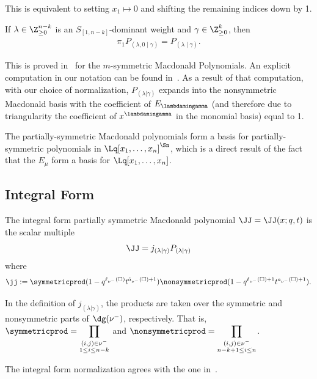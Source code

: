 This is equivalent to setting $x_1 \mapsto 0$ and shifting the remaining indices down by 1.


\begin{prop} If $\lambda \in \Z_{\geq 0}^{n-k}$ is an $S_{[1,n-k]}$-dominant weight and $\gamma \in \Z_{\geq 0}^k$, then
\begin{align}\label{stability}\pi_1 P_{(\lambda,0\mid\gamma)} =  P_{(\lambda\mid\gamma)}.\end{align}\end{prop}

This is proved in~\cite{Lapointe} for the $m$-symmetric Macdonald Polynomials. An explicit computation in our notation can be found in~\cite{Dissertation}. As a result of that computation, with our choice of normalization, $P_{(\lambda|\gamma)}$ expands into the nonsymmetric Macdonald basis with the coefficient of $E_{\lambdamingamma}$ (and therefore due to triangularity the coefficient of $x^{\lambdamingamma}$ in the monomial basis) equal to 1.

\begin{rema}
    The partially-symmetric Macdonald polynomials form a basis for partially-symmetric polynomials in $\Lq[x_1, \dotsc, x_n]^{\Sn}$, which is a direct result of the fact that the $E_\mu$ form a basis for $\Lq[x_1,\dotsc,x_n]$.
\end{rema}


\subsection{Integral Form}\label{integralformsection}
The integral form partially symmetric Macdonald polynomial $\JJ=\JJ(x;q,t)$ is the scalar multiple
\[
\JJ = j_{(\lambda|\gamma)}P_{(\lambda|\gamma)}
\]
where
\[
\jj := \symmetricprod (1-q^{\ell_{\nu^-}(\square)}t^{\tilde{a}_{\nu^-}(\square) + 1}) \nonsymmetricprod(1-q^{\ell_{\nu^-}(\square) + 1}t^{a_{\nu^-}(\square) + 1}).
\]


In the definition of $j_{(\lambda|\gamma)}$, the products are taken over the symmetric and nonsymmetric parts of $\dg(\nu^-)$, respectively. That is, $\displaystyle{\symmetricprod}=\displaystyle{\prod_{\substack{(i,j) \in \nu^-\\ 1\leq i \leq n-k}}}$ and $\displaystyle{\nonsymmetricprod}=\displaystyle{\prod_{\substack{(i,j) \in \nu^-\\ n-k+1 \leq i \leq n}}}$.

\begin{rema}
    The integral form normalization agrees with the one in~\cite{Lapointe}.
\end{rema}

